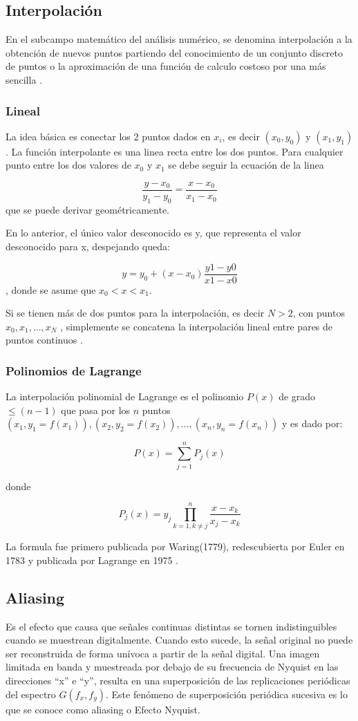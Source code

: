 \documentclass[comsoc, journal]{IEEEtran}
\begin{document}
\subsection{Interpolación}
En el subcampo matemático del análisis numérico, se denomina interpolación a la obtención de nuevos puntos partiendo del conocimiento de un conjunto discreto de puntos o la aproximación de una función de calculo costoso por una más sencilla \cite{crochiere}.

\subsubsection{Lineal}

La idea básica es conectar los 2 puntos dados en $x_i$, es decir $(x_0, y_0)$ y $(x_1, y_1)$. La función interpolante es una linea recta entre los dos puntos. Para cualquier punto entre los dos valores de $x_0$ y $x_1$ se debe seguir la ecuación de la linea

$$\frac{y - x_0}{y_1 - y_0} = \frac{x - x_0}{x_1 - x_0}$$
que se puede derivar geométricamente.

En lo anterior, el único valor desconocido es y, que representa el valor desconocido para x, despejando queda:

$$y = y_0 + (x - x_0) \frac{y1 - y0}{x1 - x0}$$
,
donde se asume que $x_0 < x < x_1$.

Si se tienen más de dos puntos para la interpolación, es decir $N > 2$, con
puntos $x_0, x_1,..., x_N$ , simplemente se concatena la interpolación lineal entre pares de puntos continuos \cite{interp}.

\subsubsection{Polinomios de Lagrange}

La interpolación polinomial de Lagrange es el polinomio $P(x)$ de grado $\leq (n-1)$ que pasa por los $n$ puntos $(x_1, y_1 = f(x_1)), (x_2, y_2 = f(x_2)), ... , (x_n, y_n = f(x_n))$ y es dado por:

$$P(x) =\sum_{j=1}^{n} P_j(x)$$

donde

$$P_j(x) = y_j \prod_{k=1 , k \neq j}^{n} \frac{x-x_k}{x_j - x_k}$$

La formula fue primero publicada por Waring(1779), redescubierta por Euler en 1783 y publicada por Lagrange en 1975 \cite{lagr}.


\subsection{Aliasing}
Es el efecto que causa que señales continuas distintas se tornen indistinguibles cuando se muestrean digitalmente. Cuando esto sucede, la señal original no puede ser reconstruida de forma unívoca a partir de la señal digital. Una imagen limitada en banda y muestreada por debajo de su frecuencia de Nyquist en las direcciones ``x'' e ``y'', resulta en una superposición de las replicaciones periódicas del espectro $G(f_x, f_y)$. Este fenómeno de superposición periódica sucesiva es lo que se conoce como aliasing o Efecto Nyquist.
\end{document}
